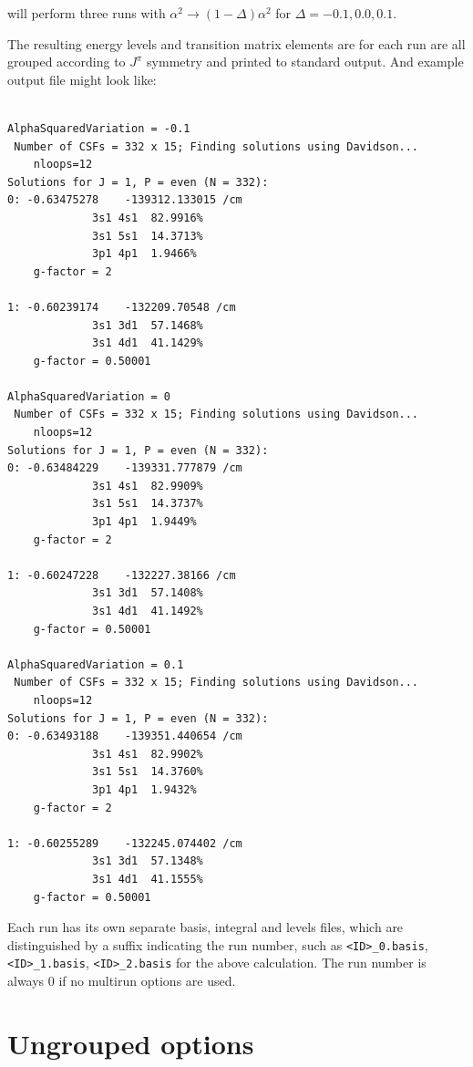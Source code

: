 \documentclass{report}
\begin{document}
will perform three runs with $\alpha^2 \to (1 - \Delta)\alpha^2$ for $\Delta = -0.1, 0.0, 0.1$.

The resulting energy levels and transition matrix elements are for each run are all grouped according to
$J^{\pi}$ symmetry and printed to standard output. And example output file might look like:

\begin{verbatim}

AlphaSquaredVariation = -0.1
 Number of CSFs = 332 x 15; Finding solutions using Davidson...
    nloops=12
Solutions for J = 1, P = even (N = 332):
0: -0.63475278    -139312.133015 /cm
             3s1 4s1  82.9916%
             3s1 5s1  14.3713%
             3p1 4p1  1.9466%
    g-factor = 2

1: -0.60239174    -132209.70548 /cm
             3s1 3d1  57.1468%
             3s1 4d1  41.1429%
    g-factor = 0.50001

AlphaSquaredVariation = 0
 Number of CSFs = 332 x 15; Finding solutions using Davidson...
    nloops=12
Solutions for J = 1, P = even (N = 332):
0: -0.63484229    -139331.777879 /cm
             3s1 4s1  82.9909%
             3s1 5s1  14.3737%
             3p1 4p1  1.9449%
    g-factor = 2

1: -0.60247228    -132227.38166 /cm
             3s1 3d1  57.1408%
             3s1 4d1  41.1492%
    g-factor = 0.50001

AlphaSquaredVariation = 0.1
 Number of CSFs = 332 x 15; Finding solutions using Davidson...
    nloops=12
Solutions for J = 1, P = even (N = 332):
0: -0.63493188    -139351.440654 /cm
             3s1 4s1  82.9902%
             3s1 5s1  14.3760%
             3p1 4p1  1.9432%
    g-factor = 2

1: -0.60255289    -132245.074402 /cm
             3s1 3d1  57.1348%
             3s1 4d1  41.1555%
    g-factor = 0.50001

\end{verbatim}

Each run has its own separate basis, integral and levels files, which are distinguished by a suffix
indicating the run number, such as \texttt{<ID>\_0.basis}, \texttt{<ID>\_1.basis}, 
\texttt{<ID>\_2.basis} for the above calculation. The run number is always 0 if no multirun options are
used.

\section{Ungrouped options}
\label{sec:ungrouped}
\end{document}
